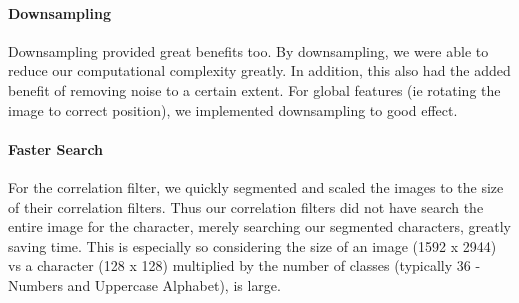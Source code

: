 \paragraph{Downsampling} Downsampling provided great benefits too. By downsampling, we were able to reduce our computational complexity
greatly. In addition, this also had the added benefit of removing noise to a certain extent. For global features (ie rotating the image to correct
position), we implemented downsampling to good effect.
\paragraph{Faster Search} For the correlation filter, we quickly segmented and scaled the images to the size of their correlation filters. Thus 
our correlation filters did not have search the entire image for the character, merely searching our segmented characters, greatly saving time. 
This is especially so considering the size of an image (1592 x 2944) vs a character (128 x 128) multiplied by the number of classes 
(typically 36 - Numbers and Uppercase Alphabet), is large.